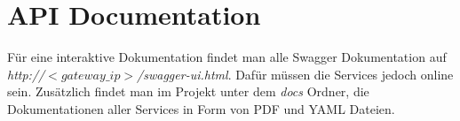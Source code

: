 \section{API Documentation}
Für eine interaktive Dokumentation findet man alle Swagger Dokumentation auf \textit{http://$<gateway\_ip>$/swagger-ui.html}. Dafür müssen die Services jedoch online sein. Zusätzlich findet man im Projekt unter dem \textit{docs} Ordner, die Dokumentationen aller Services in Form von PDF und YAML Dateien.
